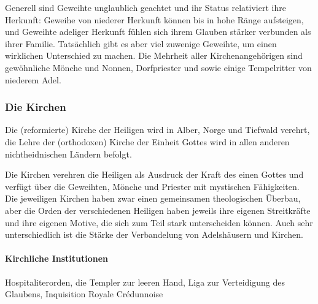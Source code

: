 \documentclass[12pt,twoside,twocolumn,openany]{book}
\begin{document}
	Generell sind Geweihte unglaublich geachtet und ihr Status relativiert ihre Herkunft: Geweihe von niederer Herkunft können bis in hohe Ränge aufsteigen, und Geweihte adeliger Herkunft fühlen sich ihrem Glauben stärker verbunden als ihrer Familie. Tatsächlich gibt es aber viel zuwenige Geweihte, um einen wirklichen Unterschied zu machen. Die Mehrheit aller Kirchenangehörigen sind gewöhnliche Mönche und Nonnen, Dorfpriester und sowie einige Tempelritter von niederem Adel.
	
	\subsubsection{Die Kirchen}
	Die (reformierte) Kirche der Heiligen wird in Alber, Norge und Tiefwald verehrt, die Lehre der (orthodoxen) Kirche der Einheit Gottes wird in allen anderen nichtheidnischen Ländern befolgt.
	
	Die Kirchen verehren die Heiligen als Ausdruck der Kraft des einen Gottes und verfügt über die Geweihten, Mönche und Priester mit mystischen Fähigkeiten. Die jeweiligen Kirchen haben zwar einen gemeinsamen theologischen Überbau, aber die Orden der verschiedenen Heiligen haben jeweils ihre eigenen Streitkräfte und ihre eigenen Motive, die sich zum Teil stark unterscheiden können. Auch sehr unterschiedlich ist die Stärke der Verbandelung von Adelshäusern und Kirchen.
	\paragraph{Kirchliche Institutionen} Hospitaliterorden, die Templer zur leeren Hand, Liga zur Verteidigung des Glaubens, Inquisition Royale Crédunnoise
	
	
\end{document}

